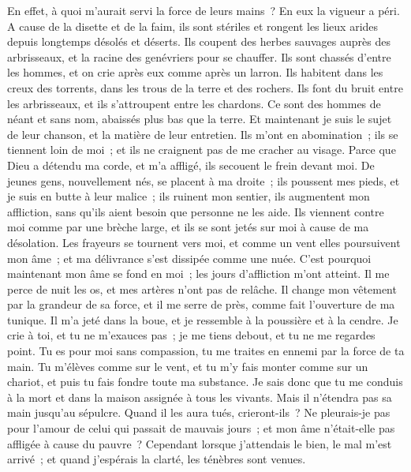 \begin{multicols}{2}
 En effet, à quoi m'aurait servi la force de leurs mains~? En eux la vigueur a péri. 
A cause de la disette et de la faim, ils sont stériles et rongent les lieux arides depuis longtemps désolés et déserts. 
Ils coupent des herbes sauvages auprès des arbrisseaux, et la racine des genévriers pour se chauffer. 
Ils sont chassés d'entre les hommes, et on crie après eux comme après un larron. 
Ils habitent dans les creux des torrents, dans les trous de la terre et des rochers.
Ils font du bruit entre les arbrisseaux, et ils s'attroupent entre les chardons. 
Ce sont des hommes de néant et sans nom, abaissés plus bas que la terre. 
Et maintenant je suis le sujet de leur chanson, et la matière de leur entretien.
Ils m'ont en abomination~; ils se tiennent loin de moi~; et ils ne craignent pas de me cracher au visage. 
Parce que Dieu a détendu ma corde, et m'a affligé, ils secouent le frein devant moi.
De jeunes gens, nouvellement nés, se placent à ma droite~; ils poussent mes pieds, et je suis en butte à leur malice~;
ils ruinent mon sentier, ils augmentent mon affliction, sans qu'ils aient besoin que personne ne les aide.
Ils viennent contre moi comme par une brèche large, et ils se sont jetés sur moi à cause de ma désolation. 
Les frayeurs se tournent vers moi, et comme un vent elles poursuivent mon âme~; et ma délivrance s'est dissipée comme une nuée.
C'est pourquoi maintenant mon âme se fond en moi~; les jours d'affliction m'ont atteint. 
Il me perce de nuit les os, et mes artères n'ont pas de relâche. 
Il change mon vêtement par la grandeur de sa force, et il me serre de près, comme fait l'ouverture de ma tunique.
Il m'a jeté dans la boue, et je ressemble à la poussière et à la cendre. 
Je crie à toi, et tu ne m'exauces pas~; je me tiens debout, et tu ne me regardes point. 
Tu es pour moi sans compassion, tu me traites en ennemi par la force de ta main. 
Tu m'élèves comme sur le vent, et tu m'y fais monter comme sur un chariot, et puis tu fais fondre toute ma substance. 
Je sais donc que tu me conduis à la mort et dans la maison assignée à tous les vivants.
Mais il n'étendra pas sa main jusqu'au sépulcre. Quand il les aura tués, crieront-ils~? 
Ne pleurais-je pas pour l'amour de celui qui passait de mauvais jours~; et mon âme n'était-elle pas affligée à cause du pauvre~?
Cependant lorsque j'attendais le bien, le mal m'est arrivé~; et quand j'espérais la clarté, les ténèbres sont venues. 

\end{multicols}
